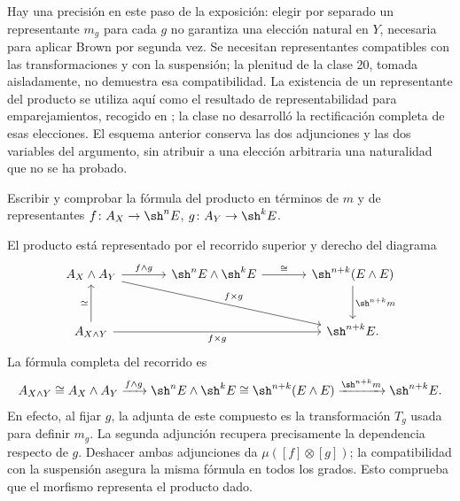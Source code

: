 Hay una precisión en este paso de la exposición: elegir por separado un representante $m_g$ para cada $g$ no garantiza una elección natural en $Y$, necesaria para aplicar Brown por segunda vez. Se necesitan representantes compatibles con las transformaciones y con la suspensión; la plenitud de la clase 20, tomada aisladamente, no demuestra esa compatibilidad. La existencia de un representante del producto se utiliza aquí como el resultado de representabilidad para emparejamientos, recogido en \cite[\S6]{baker2002}; la clase no desarrolló la rectificación completa de esas elecciones. El esquema anterior conserva las dos adjunciones y las dos variables del argumento, sin atribuir a una elección arbitraria una naturalidad que no se ha probado.

\begin{ejer}\label{ejer:c24-producto-representado}
Escribir y comprobar la fórmula del producto en términos de $m$ y de representantes $f\colon A_X\to \sh^nE$, $g\colon A_Y\to \sh^kE$.
\end{ejer}
\begin{sol}
El producto está representado por el recorrido superior y derecho del diagrama
\[
\begin{tikzcd}[column sep=large,row sep=large]
A_X\wedge A_Y\arrow[r,"f\wedge g"]\arrow[drr,"f\times g",description]&
\sh^nE\wedge \sh^kE\arrow[r,"\cong"]&\sh^{n+k}(E\wedge E)\arrow[d,"\sh^{n+k}m"]\\
A_{X\wedge Y}\arrow[u,"\simeq"]\arrow[rr,"f\times g"']&&\sh^{n+k}E.
\end{tikzcd}
\]
La fórmula completa del recorrido es
\[
A_{X\wedge Y}\cong A_X\wedge A_Y
\xrightarrow{f\wedge g}\sh^nE\wedge \sh^kE
\cong\sh^{n+k}(E\wedge E)
\xrightarrow{\sh^{n+k}m}\sh^{n+k}E.
\]
En efecto, al fijar $g$, la adjunta de este compuesto es la transformación $T_g$ usada para definir $m_g$. La segunda adjunción recupera precisamente la dependencia respecto de $g$. Deshacer ambas adjunciones da $\mu([f]\otimes[g])$; la compatibilidad con la suspensión asegura la misma fórmula en todos los grados. Esto comprueba que el morfismo representa el producto dado.
\end{sol}

